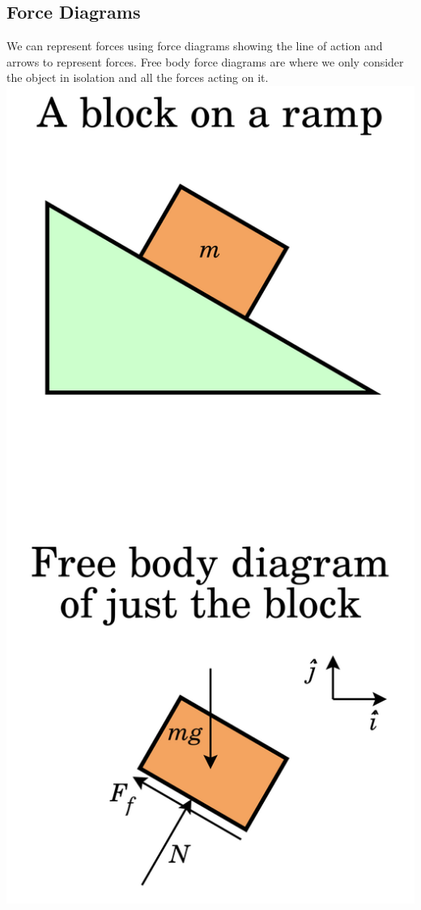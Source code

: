 \documentclass[a4paper,12pt]{article}
\begin{document}
\subsection*{Force Diagrams}
We can represent forces using force diagrams showing the line of action and arrows to represent forces. Free body force diagrams are where we only consider the object in isolation and all the forces acting on it. \\
\includegraphics[scale=0.1]{ForceDiagram}\\
\end{document}

